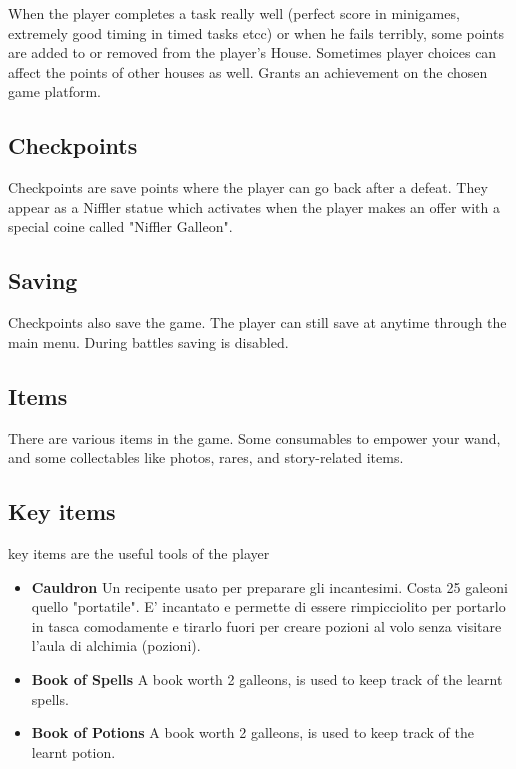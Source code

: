 When the player completes a task really well (perfect score in minigames, extremely good timing in timed tasks etcc) or when he fails terribly, some points are added to or removed from the player's House. Sometimes player choices can affect the points of other houses as well.
Grants an achievement on the chosen game platform.

\subsection{Checkpoints }

Checkpoints are save points where the player can go back after a defeat. They appear as a Niffler statue which activates when the player makes an offer with a special coine called "Niffler Galleon".

\subsection{Saving}

Checkpoints also save the game. The player can still save at anytime through the main menu. During battles saving is disabled.

\subsection{Items}

There are various items in the game. Some consumables to empower your wand, and some collectables like photos, rares, and story-related items.

\subsection{Key items}

key items are the useful tools of the player \\

\begin{itemize}
    \item \textbf {Cauldron} 
 Un recipente usato per preparare gli incantesimi. Costa 25 galeoni quello "portatile". E' incantato e permette di essere rimpicciolito per portarlo in tasca comodamente e tirarlo fuori per creare pozioni al volo senza visitare l'aula di alchimia (pozioni).
 
   \item \textbf{Book of Spells }   
A book worth 2 galleons, is used to keep track of the learnt spells.
   
 \item \textbf{Book of Potions}
 A book worth 2 galleons, is used to keep track of the learnt potion.
\end{itemize}

